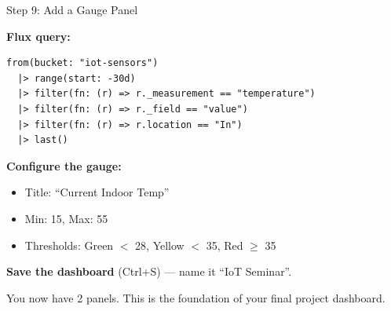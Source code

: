 \documentclass[aspectratio=169,11pt]{beamer}
\begin{document}
\begin{frame}[fragile]{Step 9: Add a Gauge Panel}

    \vspace{0.3cm}
    \textbf{Flux query:}
\begin{lstlisting}
from(bucket: "iot-sensors")
  |> range(start: -30d)
  |> filter(fn: (r) => r._measurement == "temperature")
  |> filter(fn: (r) => r._field == "value")
  |> filter(fn: (r) => r.location == "In")
  |> last()
\end{lstlisting}

    \vspace{0.2cm}
    \textbf{Configure the gauge:}
    \begin{itemize}
        \item Title: ``Current Indoor Temp''
        \item Min: 15, Max: 55
        \item Thresholds: Green $<$ 28, Yellow $<$ 35, Red $\geq$ 35
    \end{itemize}

    \vspace{0.2cm}
    \textbf{Save the dashboard} (Ctrl+S) --- name it ``IoT Seminar''.

    \vspace{0.1cm}
    {\small You now have 2 panels. This is the foundation of your final project dashboard.}
\end{frame}
\end{document}
